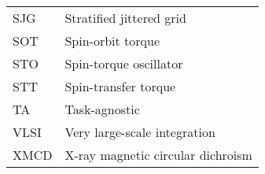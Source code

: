 {\begin{longtable}[l]{ll}
        SJG   & Stratified jittered grid                    \\
        SOT   & Spin-orbit torque                           \\
        STO   & Spin-torque oscillator                      \\
        STT   & Spin-transfer torque                        \\
        TA    & Task-agnostic                               \\
        VLSI  & Very large-scale integration                \\
        XMCD  & X-ray magnetic circular dichroism           \\
    \end{longtable}
}
